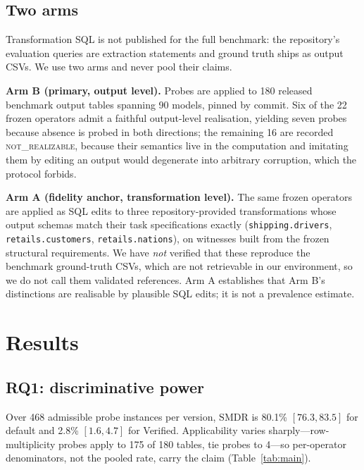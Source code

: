 \documentclass[10pt,conference]{IEEEtran}
\begin{document}
\subsection{Two arms}

Transformation SQL is not published for the full benchmark: the repository's
evaluation queries are extraction statements and ground truth ships as output
CSVs. We use two arms and never pool their claims.

\textbf{Arm B (primary, output level).} Probes are applied to 180 released
benchmark output tables spanning 90 models, pinned by commit. Six of the 22
frozen operators admit a faithful output-level realisation, yielding seven probes
because absence is probed in both directions; the remaining 16 are recorded
\textsc{not\_realizable}, because their semantics live in the computation and
imitating them by editing an output would degenerate into arbitrary corruption,
which the protocol forbids.

\textbf{Arm A (fidelity anchor, transformation level).} The same frozen operators
are applied as SQL edits to three repository-provided transformations whose output
schemas match their task specifications exactly (\texttt{shipping.drivers},
\texttt{retails.cus\-tomers}, \texttt{retails.nations}), on witnesses built from the
frozen structural requirements. We have \emph{not} verified that these reproduce
the benchmark ground-truth CSVs, which are not retrievable in our environment, so
we do not call them validated references. Arm A establishes that Arm B's
distinctions are realisable by plausible SQL edits; it is not a prevalence
estimate.

\section{Results}
\label{sec:results}

\subsection{RQ1: discriminative power}

Over 468 admissible probe instances per version, $\mathrm{SMDR}$ is 80.1\%
$[76.3,83.5]$ for default and 2.8\% $[1.6,4.7]$ for Verified. Applicability varies
sharply---row-multiplicity probes apply to 175 of 180 tables, tie probes to
4---so per-operator denominators, not the pooled rate, carry the claim
(Table~\ref{tab:main}).
\end{document}
